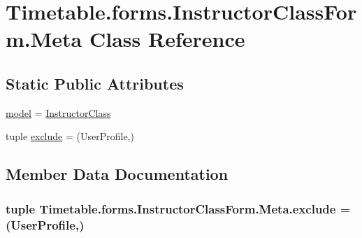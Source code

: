 \hypertarget{classTimetable_1_1forms_1_1InstructorClassForm_1_1Meta}{}\section{Timetable.\+forms.\+Instructor\+Class\+Form.\+Meta Class Reference}
\label{classTimetable_1_1forms_1_1InstructorClassForm_1_1Meta}
\subsection*{Static Public Attributes}
\begin{DoxyCompactItemize}
\item 
\hyperlink{classTimetable_1_1forms_1_1InstructorClassForm_1_1Meta_ac50b27b88d468035f13912906a3f6e1f}{model} = \hyperlink{classTimetable_1_1models_1_1InstructorClass}{Instructor\+Class}
\item 
tuple \hyperlink{classTimetable_1_1forms_1_1InstructorClassForm_1_1Meta_a17bea47d9d478eadb1a7b36abd354885}{exclude} = (\textquotesingle{}User\+Profile\textquotesingle{},)
\end{DoxyCompactItemize}


\subsection{Member Data Documentation}
\subsubsection[{\texorpdfstring{exclude}{exclude}}]{\setlength{\rightskip}{0pt plus 5cm}tuple Timetable.\+forms.\+Instructor\+Class\+Form.\+Meta.\+exclude = (\textquotesingle{}User\+Profile\textquotesingle{},)\hspace{0.3cm}{\ttfamily [static]}}\hypertarget{classTimetable_1_1forms_1_1InstructorClassForm_1_1Meta_a17bea47d9d478eadb1a7b36abd354885}{}\label{classTimetable_1_1forms_1_1InstructorClassForm_1_1Meta_a17bea47d9d478eadb1a7b36abd354885}
